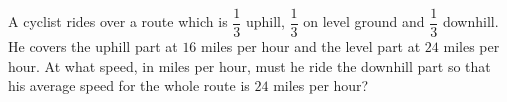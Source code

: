 A cyclist rides over a route which is $\dfrac13$ uphill, $\dfrac13$ on level ground and $\dfrac13$ downhill. He covers the uphill part at $16$ miles per hour and the level part at $24$ miles per hour. At what speed, in miles per hour, must he ride the downhill part so that his average speed for the whole route is $24$ miles per hour?

